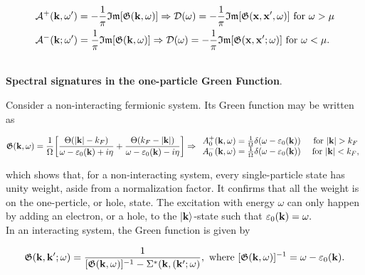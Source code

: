 \documentclass{homework}
\begin{document}
\begin{equation}
    \begin{split}
        &\mathcal{A}^{+}({\bf k}, \omega') = -\frac{1}{\pi} \mathfrak{I}\mathfrak{m}[\mathfrak{G}({\bf k}, \omega)] \Rightarrow \mathcal{D}(\omega) = -\frac{1}{\pi} \mathfrak{I}\mathfrak{m}[\mathfrak{G}({\bf x}, {\bf x}', \omega)]  \textnormal{ for } \omega > \mu  \\
        &\mathcal{A}^{-}({\bf k}; \omega') = \frac{1}{\pi} \mathfrak{I}\mathfrak{m}[\mathfrak{G}({\bf k}, \omega)] \Rightarrow \mathcal{D}(\omega) = -\frac{1}{\pi} \mathfrak{I}\mathfrak{m}[\mathfrak{G}({\bf x}, {\bf x}'; \omega)]  \textnormal{ for } \omega < \mu.
    \end{split}
\end{equation}

\blanky \\

\textbf{Spectral signatures in the one-particle Green Function}. 

Consider a non-interacting fermionic system. Its Green function may be written as 

\begin{equation}
    \mathfrak{G}({\bf k}, \omega) = \frac{1}{\Omega} \bigg[\frac{\Theta(|{\bf k}| - k_F)}{\omega - \varepsilon_0({\bf k}) + i \eta} + \frac{\Theta(k_F-|{\bf k}|)}{\omega - \varepsilon_0({\bf k}) - i \eta}\bigg] \Rightarrow \begin{array}{cc}
        A_0^+({\bf k}, \omega) = \frac{1}{\Omega} \delta(\omega - \varepsilon_0({\bf k})) & \textnormal{ for } |{\bf k}| > k_F \\
        A_0^-({\bf k}, \omega) = \frac{1}{\Omega} \delta(\omega - \varepsilon_0({\bf k})) & \textnormal{ for } |{\bf k}| < k_F,
    \end{array}
\end{equation}

which shows that, for a non-interacting system, every single-particle state has unity weight, aside from a normalization factor. It confirms that all the weight is on the one-perticle, or hole, state. The excitation with energy $\omega$ can only happen by adding an electron, or a hole, to the $\ket{{\bf k}}$-state such that $\varepsilon_0({\bf k}) = \omega.$ \\

In an interacting system, the Green function is given by 

\begin{equation}
    \mathfrak{G}({\bf k}, {\bf k}'; \omega) = \frac{1}{[\mathfrak{G}({\bf k}, \omega)]^{-1} - \Sigma^{*}({\bf k}, ({\bf k}'; \omega)}, \textnormal{ where } [\mathfrak{G}({\bf k}, \omega)]^{-1} = \omega - \varepsilon_0({\bf k}).
\end{equation}
 
\end{document}
